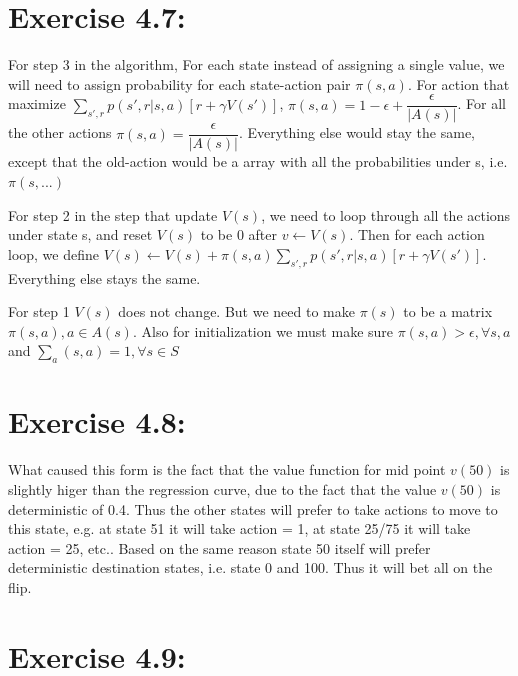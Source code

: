 \documentclass[10pt,letterpaper]{article}
\begin{document}
\section*{Exercise 4.7: }
\label{4.7}

For step 3 in the algorithm, For each state instead of assigning a single value, we will need to assign probability for each state-action pair $\pi(s,a)$. For action that maximize $\sum_{s',r}p(s',r|s,a)[r+\gamma V(s')]$, $\pi(s,a) = 1 - \epsilon + \dfrac{\epsilon}{|A(s)|}$. For all the other actions $\pi(s,a) = \dfrac{\epsilon}{|A(s)|}$. Everything else would stay the same, except that the old-action would be a array with all the probabilities under s, i.e. $\pi(s, ...)$

For step 2 in the step that update $V(s)$, we need to loop through all the actions under state s, and reset $V(s)$ to be 0 after $v \gets V(s)$. Then for each action loop, we define $V(s) \gets V(s) + \pi(s,a)\sum_{s',r}p(s',r|s,a)[r+\gamma V(s')]$. Everything else stays the same.

For step 1 $V(s)$ does not change. But we need to make $\pi(s)$ to be a matrix $\pi(s,a), a \in A(s)$. Also for initialization we must make sure $\pi(s,a) > \epsilon, \forall s,a$ and $\sum_a(s,a) = 1, \forall s \in S$


\section*{Exercise 4.8: }
\label{4.8}

What caused this form is the fact that the value function for mid point $v(50)$ is slightly higer than the regression curve, due to the fact that the value $v(50)$ is deterministic of 0.4. Thus the other states will prefer to take actions to move to this state, e.g. at state 51 it will take action = 1, at state 25/75 it will take action = 25, etc.. Based on the same reason state 50 itself will prefer deterministic destination states, i.e. state 0 and 100. Thus it will bet all on the flip.


\section*{Exercise 4.9: }
\label{4.9}
\end{document}
